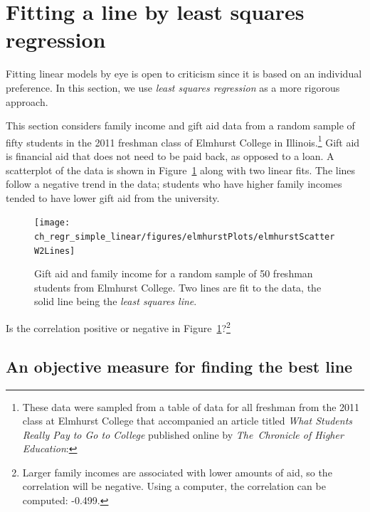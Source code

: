 \section{Fitting a line by least squares regression}
\label{fittingALineByLSR}


Fitting linear models by eye is open to criticism since it is based on an individual preference. In this section, we use \emph{least squares regression} as a more rigorous approach.

This section considers family income and gift aid data from a random sample of fifty students in the 2011 freshman class of Elmhurst College in Illinois.\footnote{These data were sampled from a table of data for all freshman from the 2011 class at Elmhurst College that accompanied an article titled \emph{What Students Really Pay to Go to College} published online by \emph{The~Chronicle of Higher Education}: } Gift aid is financial aid that does not need to be paid back, as opposed to a loan. A scatterplot of the data is shown in Figure~\ref{elmhurstScatterW2Lines} along with two linear fits. The lines follow a negative trend in the data; students who have higher family incomes tended to have lower gift aid from the university.

\begin{figure}
\centering
\texttt{[image: ch\_regr\_simple\_linear/figures/elmhurstPlots/elmhurstScatterW2Lines]}
\caption{Gift aid and family income for a random sample of 50 freshman students from Elmhurst College. Two lines are fit to the data, the solid line being the \emph{least squares line}.}
\label{elmhurstScatterW2Lines}
\end{figure}

\begin{exercise}
Is the correlation positive or negative in Figure~\ref{elmhurstScatterW2Lines}?\footnote{Larger family incomes are associated with lower amounts of aid, so the correlation will be negative. Using a computer, the correlation can be computed: -0.499.}
\end{exercise}


\subsection{An objective measure for finding the best line}

